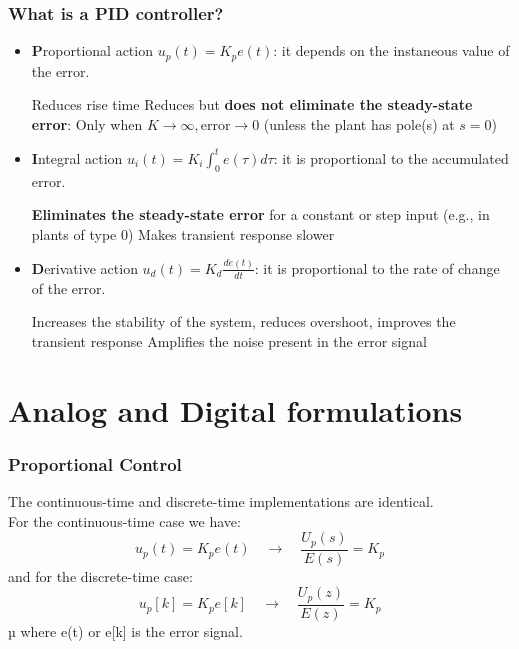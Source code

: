 \begin{frame}
	\frametitle{What is a PID controller?}
	\footnotesize{
	\begin{itemize}
		\item \textbf{P}roportional action $u_p(t) = K_p e(t)$: it depends on the instaneous value of the error. 
			\begin{itemize}
				\pro Reduces rise time
				\pro Reduces but \textbf{does not eliminate the steady-state error}: Only when $K \rightarrow \infty , \text{error} \rightarrow 0$
				 (unless the plant has pole(s) at $s=0$)
			\end{itemize}
		\item \textbf{I}ntegral action $u_i(t) =K_i\int_0^t e(\tau)d\tau$: it is proportional to the accumulated error.
			\begin{itemize}
				\pro \textbf{Eliminates the steady-state error} for a constant or step input (e.g., in plants of type 0)
				\con Makes transient response slower 
			\end{itemize}
	
		\item \textbf{D}erivative action $u_d(t) = K_d \frac{de(t)}{dt}$: it is proportional to the rate of change of the error. 
			\begin{itemize}
				\pro Increases the stability of the system, reduces overshoot, improves the transient response
				\con Amplifies the noise present in the error signal
			\end{itemize}
	\end{itemize}}
\end{frame}

\section{Analog and Digital formulations}

\begin{frame}
	\frametitle{Proportional Control}
	The continuous-time and discrete-time implementations are identical.\\
	\vspace{1em}
	For the continuous-time case we have:
	\begin{equation*}
		u_p(t) = K_p e(t) \quad \rightarrow \quad \frac{U_p(s)}{E(s)} = K_p 
	\end{equation*}
	and for the discrete-time case:
	\begin{equation*}
		u_p[k] = K_p e[k] \quad \rightarrow \quad \frac{U_p(z)}{E(z)} = K_p 
	\end{equation*}µ
	where e(t) or e[k] is the error signal.
\end{frame}

